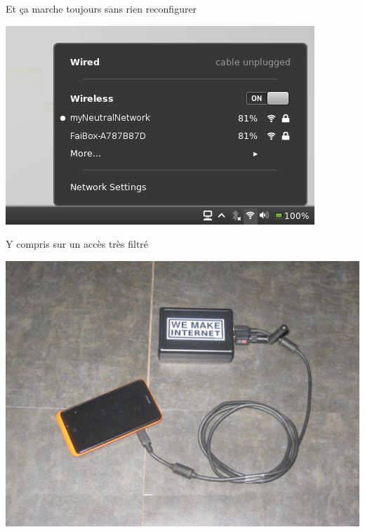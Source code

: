 \documentclass[notes=hide]{beamer}
\begin{document}
\begin{frame}[t]{Et ça marche toujours sans rien reconfigurer}
\begin{center}
\vfill
\includegraphics[width=.8\textwidth]{img/12-capture-wifiboitier2.png}
\vfill
\end{center}
\end{frame}



\begin{frame}[t]{Y compris sur un accès très filtré}
\begin{center}
\vfill
\includegraphics[width=.75\textwidth]{img/23-photo-boitier3g.jpg}
\vfill
\end{center}
\end{frame}



\end{document}

